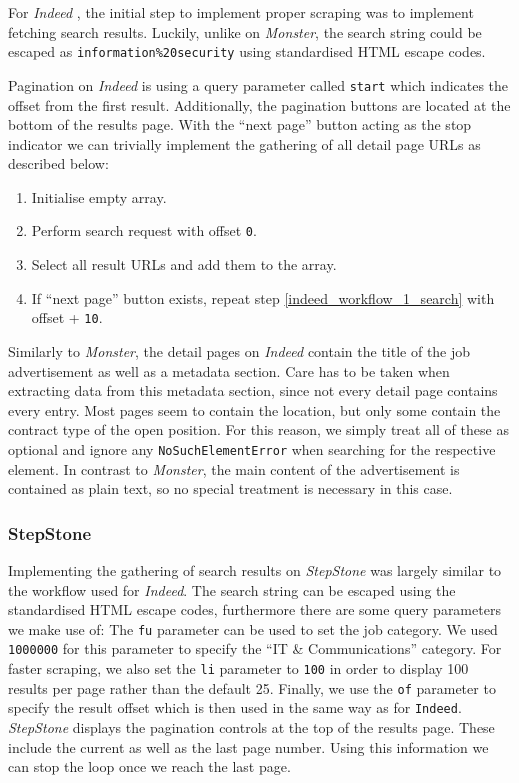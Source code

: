 \documentclass[runningheads]{llncs}
\begin{document}
For \textit{Indeed} \cite{indeed}, the initial step to implement proper scraping was to implement fetching search results. Luckily, unlike on \textit{Monster}, the search string could be escaped as \texttt{information\%20security} using standardised HTML escape codes.

Pagination on \textit{Indeed} is using a query parameter called \texttt{start} which indicates the offset from the first result. Additionally, the pagination buttons are located at the bottom of the results page. With the “next page” button acting as the stop indicator we can trivially implement the gathering of all detail page URLs as described below:

\begin{enumerate}
  \item Initialise empty array.
  \item \label{indeed_workflow_1_search}
    Perform search request with offset \texttt{0}.
  \item Select all result URLs and add them to the array.
  \item If “next page” button exists, repeat step \ref{indeed_workflow_1_search} with offset + \texttt{10}.
\end{enumerate}

Similarly to \textit{Monster}, the detail pages on \textit{Indeed} contain the title of the job advertisement as well as a metadata section. Care has to be taken when extracting data from this metadata section, since not every detail page contains every entry. Most pages seem to contain the location, but only some contain the contract type of the open position. For this reason, we simply treat all of these as optional and ignore any \texttt{NoSuchElementError} when searching for the respective element. In contrast to \textit{Monster}, the main content of the advertisement is contained as plain text, so no special treatment is necessary in this case.

\subsubsection{StepStone}
\label{subsub:stepstone}

Implementing the gathering of search results on \textit{StepStone} \cite{stepstone} was largely similar to the workflow used for \textit{Indeed}. The search string can be escaped using the standardised HTML escape codes, furthermore there are some query parameters we make use of: The \texttt{fu} parameter can be used to set the job category. We used \texttt{1000000} for this parameter to specify the “IT \& Communications” category. For faster scraping, we also set the \texttt{li} parameter to \texttt{100} in order to display 100 results per page rather than the default 25. Finally, we use the \texttt{of} parameter to specify the result offset which is then used in the same way as for \texttt{Indeed}. \textit{StepStone} displays the pagination controls at the top of the results page. These include the current as well as the last page number. Using this information we can stop the loop once we reach the last page.
\end{document}
